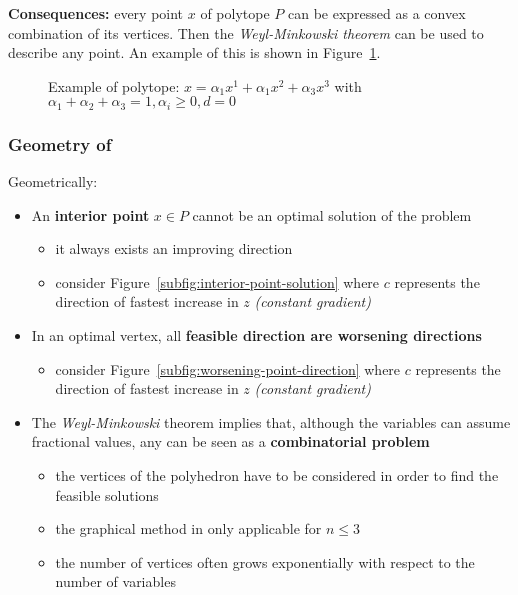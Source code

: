 \documentclass[english]{article}
\begin{document}
\textbf{Consequences:}
every point \(x\) of polytope \(P\) can be expressed as a convex combination of its vertices.
Then the \textit{Weyl-Minkowski theorem} can be used to describe any point.
An example of this is shown in Figure~\ref{fig:polytope-example}.

\begin{figure}[htbp]
  \bigskip
  \centering
  \caption{Example of polytope: \(x = \alpha_1 x^1 + \alpha_1 x^2 + \alpha_3 x^3\) with \(\alpha_1 + \alpha_2 + \alpha_3 = 1, \alpha_i \geq 0, d = 0\)}
  \label{fig:polytope-example}
  \bigskip
\end{figure}

\subsubsection{Geometry of \LP}

Geometrically:

\begin{itemize}
  \item An \textbf{interior point} \(x \in P\) cannot be an optimal solution of the problem
        \begin{itemize}
          \item it always exists an improving direction
          \item consider Figure~\ref{subfig:interior-point-solution} where \(c\) represents the direction of fastest increase in \(z\) \textit{(constant gradient)}
        \end{itemize}
  \item In an optimal vertex, all \textbf{feasible direction are worsening directions}
        \begin{itemize}
          \item consider Figure~\ref{subfig:worsening-point-direction} where \(c\) represents the direction of fastest increase in \(z\) \textit{(constant gradient)}
        \end{itemize}
  \item The \textit{Weyl-Minkowski} theorem implies that, although the variables can assume fractional values, any \LP can be seen as a \textbf{combinatorial problem}
        \begin{itemize}
          \item {} the vertices of the polyhedron have to be considered in order to find the feasible solutions
          \item the graphical method in only applicable for \(n \leq 3\)
          \item the number of vertices often grows exponentially with respect to the number of variables
        \end{itemize}
\end{itemize}
\end{document}
